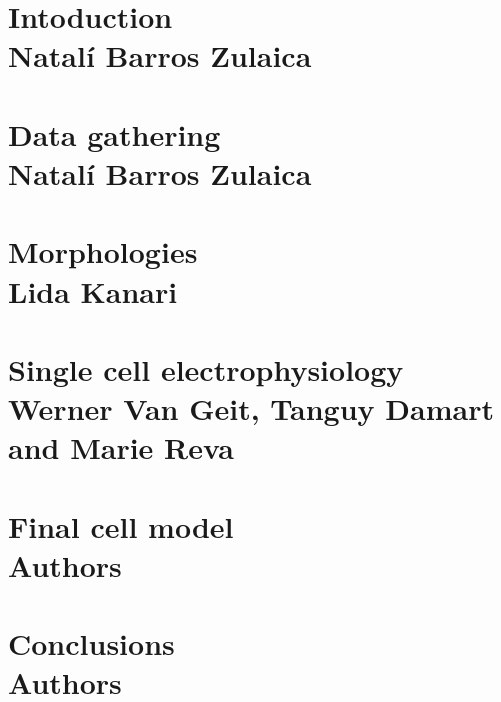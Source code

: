 \documentclass[11pt,a4paper]{book}
\begin{document}



\chapter*{Intoduction\protect\\ \Large{Natal\'i Barros Zulaica}}


\chapter*{Data gathering\protect\\ \Large{Natal\'i Barros Zulaica}}



\chapter*{Morphologies\protect\\ \Large{Lida Kanari}}



\chapter*{Single cell electrophysiology\protect\\ \Large{Werner Van Geit, Tanguy Damart and Marie Reva}}



\chapter*{Final cell model\protect\\ \Large{Authors}}


\chapter*{Conclusions\protect\\ \Large{Authors}}








\end{document}
